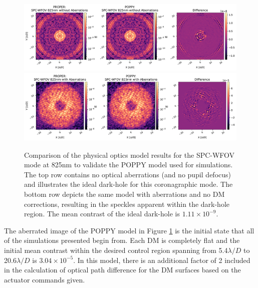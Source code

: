 \documentclass[12pt]{spieman}  %
\begin{document}
\begin{spacing}{2}
\begin{figure}[h]
    \centering
    \includegraphics[scale=0.5]{figs-poppy/spc_wfov_825_unaberrated.pdf}
    \includegraphics[scale=0.5]{figs-poppy/spc_wfov_825_aberrated.pdf}
    \caption{Comparison of the physical optics model results for the SPC-WFOV mode at 825nm to validate the POPPY model used for simulations. The top row contains no optical aberrations (and no pupil defocus) and illustrates the ideal dark-hole for this coronagraphic mode. The bottom row depicts the same model with aberrations and no DM corrections, resulting in the speckles apparent within the dark-hole region. The mean contrast of the ideal dark-hole is $1.11\times10^{-9}$.}
    \label{fig:spc-wfov-comp}
\end{figure}

The aberrated image of the POPPY model in Figure \ref{fig:spc-wfov-comp} is the initial state that all of the simulations presented begin from. Each DM is completely flat and the initial mean contrast within the desired control region spanning from 5.4$\lambda/D$ to 20.6$\lambda/D$ is $3.04\times10^{-5}$. In this model, there is an additional factor of 2 included in the calculation of optical path difference for the DM surfaces based on the actuator commands given.


\end{spacing}
\end{document}
